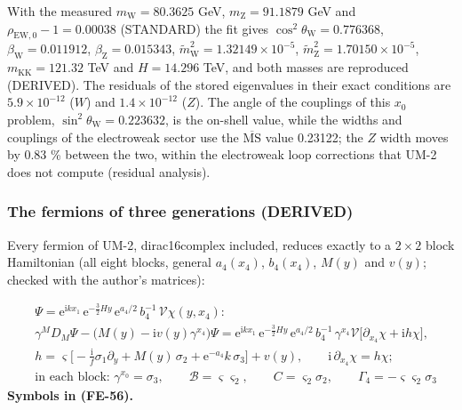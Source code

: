 \documentclass[
  10pt,
]{article}
\begin{document}
With the measured \(m_{\mathrm{W}} = 80.3625\) GeV,
\(m_{\mathrm{Z}} = 91.1879\) GeV and
\(\rho_{\mathrm{EW},0} - 1 = 0.00038\) (STANDARD) the fit gives
\(\cos^2\theta_{\mathrm{W}} = 0.776368\),
\(\beta_{\mathrm{W}} = 0.011912\), \(\beta_{\mathrm{Z}} = 0.015343\),
\(\tilde m_{\mathrm{W}}^2 = 1.32149\times10^{-5}\),
\(\tilde m_{\mathrm{Z}}^2 = 1.70150\times10^{-5}\),
\(m_{\mathrm{KK}} = 121.32\) TeV and \(H = 14.296\) TeV, and both masses
are reproduced (DERIVED). The residuals of the stored eigenvalues in
their exact conditions are \(5.9\times10^{-12}\) (\(W\)) and
\(1.4\times10^{-12}\) (\(Z\)). The angle of the couplings of this
\(x_0\) problem, \(\sin^2\theta_{\mathrm{W}} = 0.223632\), is the
on-shell value, while the widths and couplings of the electroweak sector
use the \(\overline{\mathrm{MS}}\) value 0.23122; the \(Z\) width moves
by 0.83 \% between the two, within the electroweak loop corrections that
UM-2 does not compute (residual analysis).

\hypertarget{the-fermions-of-three-generations-derived}{%
\subsubsection*{The fermions of three generations
(DERIVED)}\label{the-fermions-of-three-generations-derived}}

Every fermion of UM-2, dirac16complex included, reduces exactly to a
\(2\times2\) block Hamiltonian (all eight blocks, general \(a_4(x_4)\),
\(b_4(x_4)\), \(M(y)\) and \(v(y)\); checked with the author's
matrices):

\[
\begin{aligned}
&\Psi = \mathrm{e}^{\mathrm{i}kx_1}\,\mathrm{e}^{-\frac32Hy}\,\mathrm{e}^{a_4/2}\,b_4^{-1}\,\mathcal{V}
 \chi(y, x_4):\\
&\gamma^MD_M\Psi - \big(M(y) - \mathrm{i}v(y)\gamma^{x_4}\big)\Psi
 = \mathrm{e}^{\mathrm{i}kx_1}\,\mathrm{e}^{-\frac32Hy}\,\mathrm{e}^{a_4/2}\,b_4^{-1}\,\gamma^{x_4}\mathcal{V}
 \big[\partial_{x_4}\chi + \mathrm{i}h\chi\big],\\
&h = \varsigma\Big[-\frac{\mathrm{i}}{f}\sigma_1\partial_y + M(y)\,\sigma_2 +
 \mathrm{e}^{-a_4}k\,\sigma_3\Big] + v(y),\qquad
 \mathrm{i}\,\partial_{x_4}\chi = h\chi;\\
&\text{in each block: }\gamma^{x_0} = \sigma_3,\qquad \mathcal{B} = \varsigma\varsigma_2,\qquad
 C = \varsigma_2\sigma_2,\qquad \Gamma_4 = -\varsigma\varsigma_2\sigma_3
\end{aligned} \tag{FE-56}
\] \textbf{Symbols in (FE-56).}
\end{document}
